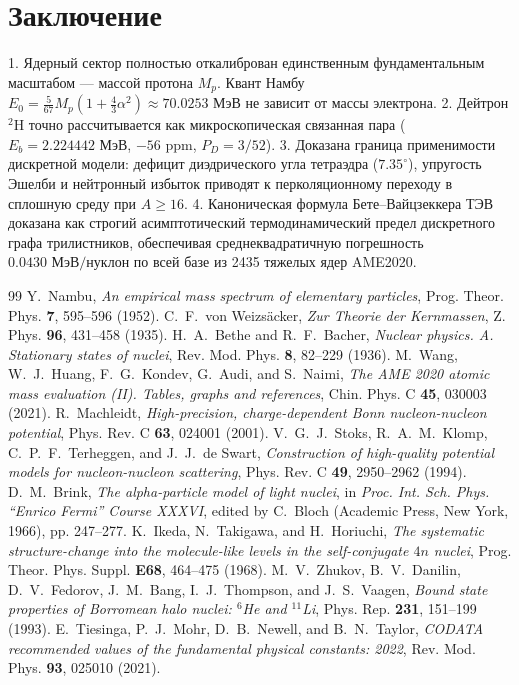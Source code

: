 \documentclass[11pt,a4paper]{article}
\theoremstyle{definition}
\theoremstyle{remark}
\begin{document}
\section{Заключение}
1. Ядерный сектор полностью откалиброван единственным фундаментальным масштабом — массой протона $M_p$. Квант Намбу $E_0 = \frac{5}{67} M_p (1 + \frac{4}{3}\alpha^2) \approx 70.0253\text{ МэВ}$ не зависит от массы электрона.
2. Дейтрон $^2\mathrm{H}$ точно рассчитывается как микроскопическая связанная пара ($E_b = 2.224442\text{ МэВ}$, $-56\text{ ppm}$, $P_D = 3/52$).
3. Доказана граница применимости дискретной модели: дефицит диэдрического угла тетраэдра ($7.35^\circ$), упругость Эшелби и нейтронный избыток приводят к перколяционному переходу в сплошную среду при $A \ge 16$.
4. Каноническая формула Бете--Вайцзеккера ТЭВ доказана как строгий асимптотический термодинамический предел дискретного графа трилистников, обеспечивая среднеквадратичную погрешность $\mathbf{0.0430\text{ МэВ/нуклон}}$ по всей базе из 2435 тяжелых ядер AME2020.

\begin{thebibliography}{99}
 Y.~Nambu, \textit{An empirical mass spectrum of elementary particles}, Prog. Theor. Phys. \textbf{7}, 595--596 (1952).
 C.~F.~von Weizs{\"a}cker, \textit{Zur Theorie der Kernmassen}, Z. Phys. \textbf{96}, 431--458 (1935).
 H.~A.~Bethe and R.~F.~Bacher, \textit{Nuclear physics. A. Stationary states of nuclei}, Rev. Mod. Phys. \textbf{8}, 82--229 (1936).
 M.~Wang, W.~J.~Huang, F.~G.~Kondev, G.~Audi, and S.~Naimi, \textit{The AME 2020 atomic mass evaluation (II). Tables, graphs and references}, Chin. Phys. C \textbf{45}, 030003 (2021).
 R.~Machleidt, \textit{High-precision, charge-dependent Bonn nucleon-nucleon potential}, Phys. Rev. C \textbf{63}, 024001 (2001).
 V.~G.~J.~Stoks, R.~A.~M.~Klomp, C.~P.~F.~Terheggen, and J.~J.~de Swart, \textit{Construction of high-quality potential models for nucleon-nucleon scattering}, Phys. Rev. C \textbf{49}, 2950--2962 (1994).
 D.~M.~Brink, \textit{The alpha-particle model of light nuclei}, in \textit{Proc. Int. Sch. Phys. ``Enrico Fermi'' Course XXXVI}, edited by C.~Bloch (Academic Press, New York, 1966), pp. 247--277.
 K.~Ikeda, N.~Takigawa, and H.~Horiuchi, \textit{The systematic structure-change into the molecule-like levels in the self-conjugate $4n$ nuclei}, Prog. Theor. Phys. Suppl. \textbf{E68}, 464--475 (1968).
 M.~V.~Zhukov, B.~V.~Danilin, D.~V.~Fedorov, J.~M.~Bang, I.~J.~Thompson, and J.~S.~Vaagen, \textit{Bound state properties of Borromean halo nuclei: $^6$He and $^{11}$Li}, Phys. Rep. \textbf{231}, 151--199 (1993).
 E.~Tiesinga, P.~J.~Mohr, D.~B.~Newell, and B.~N.~Taylor, \textit{CODATA recommended values of the fundamental physical constants: 2022}, Rev. Mod. Phys. \textbf{93}, 025010 (2021).
\end{thebibliography}
\end{document}
